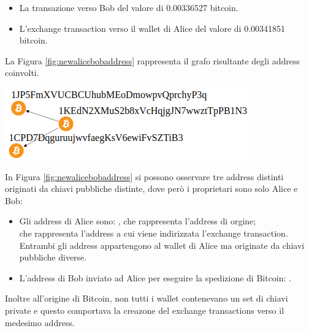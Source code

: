 \begin{itemize}
\begin{example}
    \begin{itemize}
      \item La transazione verso Bob del valore di 0.00336527 bitcoin.
      \item L’exchange transaction verso il wallet di Alice del valore di 0.00341851 bitcoin.
    \end{itemize}

    La Figura \ref{fig:newalicebobaddress} rappresenta il grafo risultante degli address coinvolti.
    {\centering
    \vspace{15pt}
    \includegraphics[scale=0.43]{images/exampleWithGraph/example-p2pkh-exchange-transaction.png}
    \vspace{10pt}
    \par}

    In Figura \ref{fig:newalicebobaddress} si possono osservare tre address distinti originati da chiavi pubbliche distinte, dove però i proprietari sono solo Alice e Bob:
    \begin{itemize}
      \item Gli address di Alice sono: , che rappresenta l’address di orgine; \\
       che rappresenta l’address a cui viene indirizzata l’exchange transaction. Entrambi gli address appartengono al wallet di Alice ma originate da chiavi pubbliche diverse.
      \item L’address di Bob inviato ad Alice per eseguire la spedizione di Bitcoin: .
    \end{itemize}
  \end{example}
\end{itemize}
Inoltre all’origine di Bitcoin, non tutti i wallet contenevano un set di chiavi private e questo comportava la creazone del exchange transactions verso il medesimo address.
